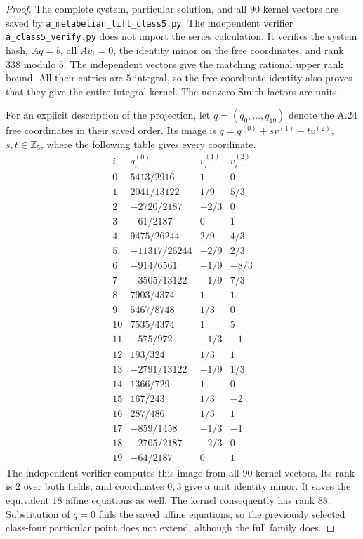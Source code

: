 \begin{proof}
The complete system, particular solution, and all $90$
kernel vectors are saved by
\texttt{a\_metabelian\_lift\_class5.py}.
The independent verifier \texttt{a\_class5\_verify.py}
does not import the series calculation. It verifies
the system hash, $Aq=b$, all $Av_i=0$, the identity
minor on the free coordinates, and rank $338$ modulo
$5$. The independent vectors give the matching rational
upper rank bound. All their entries are $5$-integral,
so the free-coordinate identity also proves that they
give the entire integral kernel. The nonzero Smith
factors are units.

For an explicit description of the projection, let
$q=(q_0,\ldots,q_{19})$ denote the A.24 free coordinates
in their saved order. Its image is
$q=q^{(0)}+s v^{(1)}+t v^{(2)}$, $s,t\in\mathbb Z_5$,
where the following table gives every coordinate.
\[
\begin{array}{r|r|r|r}
i&q_i^{(0)}&v_i^{(1)}&v_i^{(2)}\\\hline
0&5413/2916&1&0\\
1&2041/13122&1/9&5/3\\
2&-2720/2187&-2/3&0\\
3&-61/2187&0&1\\
4&9475/26244&2/9&4/3\\
5&-11317/26244&-2/9&2/3\\
6&-914/6561&-1/9&-8/3\\
7&-3505/13122&-1/9&7/3\\
8&7903/4374&1&1\\
9&5467/8748&1/3&0\\
10&7535/4374&1&5\\
11&-575/972&-1/3&-1\\
12&193/324&1/3&1\\
13&-2791/13122&-1/9&1/3\\
14&1366/729&1&0\\
15&167/243&1/3&-2\\
16&287/486&1/3&1\\
17&-859/1458&-1/3&-1\\
18&-2705/2187&-2/3&0\\
19&-64/2187&0&1
\end{array}                                                      \tag{A--XIV}
\]
The independent verifier computes this image from all
$90$ kernel vectors. Its rank is $2$ over both fields,
and coordinates $0,3$ give a unit identity minor.
It saves the equivalent $18$ affine equations as well.
The kernel consequently has rank $88$.
Substitution of $q=0$ fails the saved affine equations,
so the previously selected class-four particular point
does not extend, although the full family does.


\end{proof}
